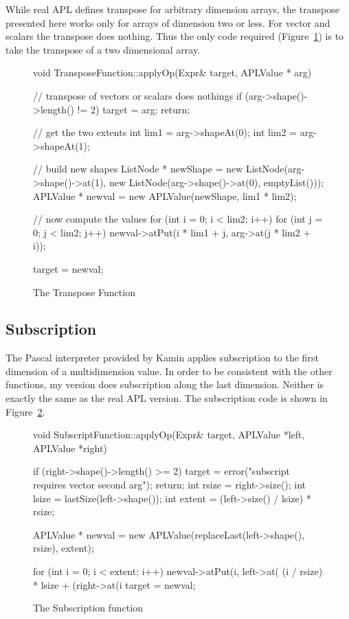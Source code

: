 While real APL defines transpose for arbitrary dimension arrays, the
transpose presented here works only for arrays of dimension two or less.
For vector and scalars the transpose does nothing.  Thus the only code
required (Figure~\ref{transpose}) is to take the transpose of a two
dimensional array.

\begin{figure}
\begin{cprog}
void TransposeFunction::applyOp(Expr& target, APLValue * arg)
{
	// transpose of vectors or scalars does nothings
	if (arg->shape()->length() != 2) {
		target = arg;
		return;
		}

	// get the two extents
	int lim1 = arg->shapeAt(0);
	int lim2 = arg->shapeAt(1);

	// build new shapes
	ListNode * newShape =
		new ListNode(arg->shape()->at(1),
		new ListNode(arg->shape()->at(0), emptyList()));
	APLValue * newval = new APLValue(newShape, lim1 * lim2);

	// now compute the values
	for (int i = 0; i < lim2; i++)
		for (int j = 0; j < lim2; j++)
			newval->atPut(i * lim1 + j,
				arg->at(j * lim2 + i));

	target = newval;
}
\end{cprog}
\caption{The Transpose Function}\label{transpose}
\end{figure}

\subsection{Subscription}

The Pascal interpreter provided by Kamin applies subscription to the first
dimension of a multidimension value.  In order to be consistent with the
other functions, my version does subscription along the last dimension.
Neither is exactly the same as the real APL version.  The subscription code
is shown in Figure~\ref{subscript}.

\begin{figure}
\begin{cprog}
void SubscriptFunction::applyOp(Expr& target, APLValue *left, APLValue *right)
{
	if (right->shape()->length() >= 2) {
		target = error("subscript requires vector second arg");
		return;
		}
	int rsize = right->size();
	int lsize = lastSize(left->shape());
	int extent = (left->size() / lsize) * rsize;

	APLValue * newval = new APLValue(replaceLast(left->shape(), rsize),
		extent);

	for (int i = 0; i < extent; i++)
		newval->atPut(i, left->at(
			(i / rsize) * lsize + (right->at(i %
	target = newval;
}
\end{cprog}
\caption{The Subscription function}\label{subscript}
\end{figure}

